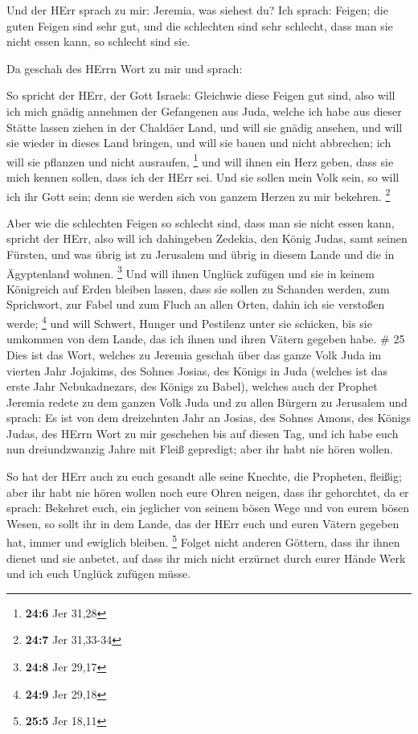  Und der HErr sprach zu mir: Jeremia, was siehest du? Ich
sprach: Feigen; die guten Feigen sind sehr gut, und die schlechten sind
sehr schlecht, dass man sie nicht essen kann, so schlecht sind sie.

 Da geschah des HErrn Wort zu mir und sprach:

 So spricht der HErr, der Gott Israels: Gleichwie diese
Feigen gut sind, also will ich mich gnädig annehmen der Gefangenen aus
Juda, welche ich habe aus dieser Stätte lassen ziehen in der Chaldäer
Land,  und will sie gnädig ansehen, und will sie wieder in
dieses Land bringen, und will sie bauen und nicht abbrechen; ich will
sie pflanzen und nicht ausraufen, \footnote{\textbf{24:6} Jer 31,28}
 und will ihnen ein Herz geben, dass sie mich kennen sollen,
dass ich der HErr sei. Und sie sollen mein Volk sein, so will ich ihr
Gott sein; denn sie werden sich von ganzem Herzen zu mir bekehren.
\footnote{\textbf{24:7} Jer 31,33-34}

 Aber wie die schlechten Feigen so schlecht sind, dass man
sie nicht essen kann, spricht der HErr, also will ich dahingeben
Zedekia, den König Judas, samt seinen Fürsten, und was übrig ist zu
Jerusalem und übrig in diesem Lande und die in Ägyptenland wohnen.
\footnote{\textbf{24:8} Jer 29,17}  Und will ihnen Unglück
zufügen und sie in keinem Königreich auf Erden bleiben lassen, dass sie
sollen zu Schanden werden, zum Sprichwort, zur Fabel und zum Fluch an
allen Orten, dahin ich sie verstoßen werde; \footnote{\textbf{24:9} Jer
  29,18}  und will Schwert, Hunger und Pestilenz unter sie
schicken, bis sie umkommen von dem Lande, das ich ihnen und ihren Vätern
gegeben habe. \# 25  Dies ist das Wort, welches zu Jeremia
geschah über das ganze Volk Juda im vierten Jahr Jojakims, des Sohnes
Josias, des Königs in Juda (welches ist das erste Jahr Nebukadnezars,
des Königs zu Babel),  welches auch der Prophet Jeremia
redete zu dem ganzen Volk Juda und zu allen Bürgern zu Jerusalem und
sprach:  Es ist von dem dreizehnten Jahr an Josias, des
Sohnes Amons, des Königs Judas, des HErrn Wort zu mir geschehen bis auf
diesen Tag, und ich habe euch nun dreiundzwanzig Jahre mit Fleiß
gepredigt; aber ihr habt nie hören wollen.

 So hat der HErr auch zu euch gesandt alle seine Knechte,
die Propheten, fleißig; aber ihr habt nie hören wollen noch eure Ohren
neigen, dass ihr gehorchtet,  da er sprach: Bekehret euch,
ein jeglicher von seinem bösen Wege und von eurem bösen Wesen, so sollt
ihr in dem Lande, das der HErr euch und euren Vätern gegeben hat, immer
und ewiglich bleiben. \footnote{\textbf{25:5} Jer 18,11} 
Folget nicht anderen Göttern, dass ihr ihnen dienet und sie anbetet, auf
dass ihr mich nicht erzürnet durch eurer Hände Werk und ich euch Unglück
zufügen müsse.

